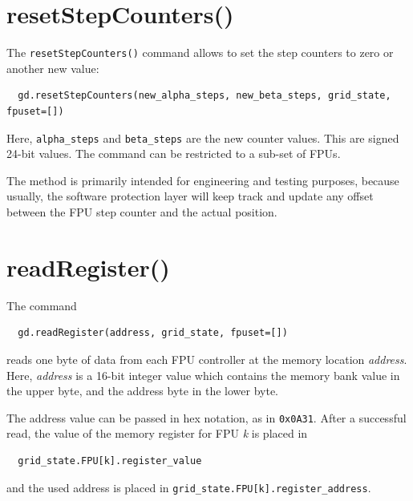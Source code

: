 \documentclass[fontsize=12,a4paper]{scrreprt}
\begin{document}

\section{resetStepCounters()}

The \texttt{resetStepCounters()} command allows to
set the step counters to zero or another new value:

\begin{verbatim}
  gd.resetStepCounters(new_alpha_steps, new_beta_steps, grid_state, fpuset=[])
\end{verbatim}

Here, \texttt{alpha\_steps} and \texttt{beta\_steps} are the new
counter values. This are signed 24-bit values. The command can be
restricted to a sub-set of FPUs.

The method is primarily intended for engineering and testing purposes,
because usually, the software protection layer will keep track and
update any offset between the FPU step counter and the actual
position.


\section{readRegister()}
\label{sec:readregister}

The command

\begin{verbatim}
  gd.readRegister(address, grid_state, fpuset=[])
\end{verbatim}
reads one byte of data from each FPU controller
at the memory location \emph{address}. Here,
\emph{address} is a 16-bit integer value
which contains the memory bank value in the
upper byte, and the address byte in the lower byte.

The address value can be passed in hex notation,
as in \texttt{0x0A31}. After a successful read,
the value of the memory register for FPU \emph{k}
is placed in

\begin{verbatim}
  grid_state.FPU[k].register_value
\end{verbatim}
and the used address is placed in
\verb+grid_state.FPU[k].register_address+.
\end{document}
